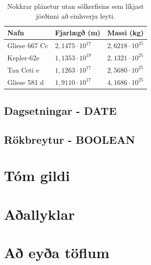 \begin{table}
\centering
\caption[Plánetur utan sólkerfisins.]{Nokkrar plánetur utan sólkerfisins sem líkjast jörðinni að einhverju leyti.}
\label{tafla:planetur}
\begin{tabular}{lll}
\toprule
Nafn&Fjarlægð (m)&Massi (kg)\\
\midrule
Gliese 667 Cc&$2,1475\cdot 10^{17}$&$2,6218\cdot10^{25}$\\
Kepler-62e   &$1,1353\cdot 10^{19}$&$2,1321\cdot10^{25}$\\
Tau Ceti e   &$1,1263\cdot 10^{17}$&$2,5680\cdot10^{25}$\\
Gliese 581 d &$1,9110\cdot 10^{17}$&$4,1686\cdot10^{25}$\\
\bottomrule
\end{tabular}
\end{table}

\begin{example}
\caption[Plánetur]{SQL-tafla sem haldið getur utan um pláneturnar í töflu \ref{tafla:planetur}. Fjarlægð þeirra frá okkar sólkerfi (í metrum) og massi þeirra (í kílóum) eru mjög óþjálar tölur, sem krefjast fleytitalna.}
\label{sql:k3d7-planetur}
\centering
{}
\end{example}

\subsection{Dagsetningar - DATE}

\subsection{Rökbreytur - BOOLEAN}

\section{Tóm gildi} %
\section{Aðallyklar} %
\section{Að eyða töflum} %
